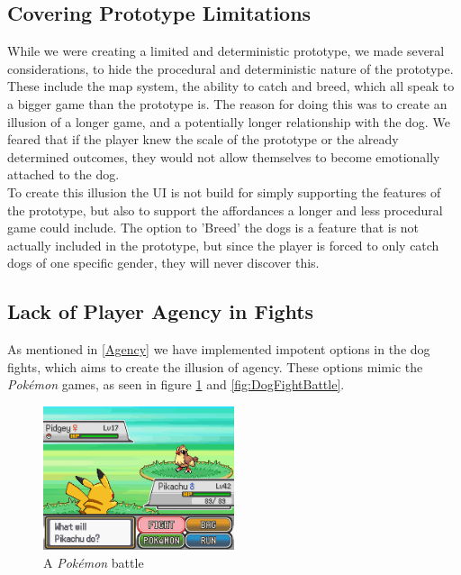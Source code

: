 




\subsection{Covering Prototype Limitations}
\label{limitations}
While we were creating a limited and deterministic prototype, we made several considerations, to hide the procedural and deterministic nature of the prototype. These include the map system, the ability to catch and breed, which all speak to a bigger game than the prototype is. The reason for doing this was to create an illusion of a longer game, and a potentially longer relationship with the dog. We feared that if the player knew the scale of the prototype or the already determined outcomes, they would not allow themselves to become emotionally attached to the dog. \\

To create this illusion the UI is not build for simply supporting the features of the prototype, but also to support the affordances a longer and less procedural game could include. The option to 'Breed' the dogs is a feature that is not actually included in the prototype, but since the player is forced to only catch dogs of one specific gender, they will never discover this.\\

\subsection{Lack of Player Agency in Fights}
As mentioned in \ref{Agency} we have implemented impotent options in the dog fights, which aims to create the illusion of agency. These options mimic the \textit{Pokémon} games, as seen in figure \ref{fig:PokeBattle} and \ref{fig:DogFightBattle}. 

\begin{figure}[h!] 
	\centering
    \includegraphics[width=0.5\textwidth]{PokemonBattle.png}
    \caption{A \textit{Pokémon} battle}
    \label{fig:PokeBattle}
\end{figure}


